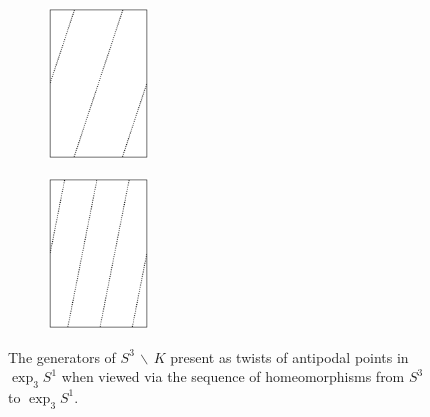 \documentclass[12pt,twoside]{reedthesis}
\theoremstyle{definition}
\newcommand{\wo}{\, \backslash \,}
\begin{document}
\begin{figure}[t]
  \centering
  \begin{subfigure}[t]{0.25\textwidth}
    \centering
    \includegraphics[height=4cm]{figures/antipodal_subset_path_1.pdf}
  \end{subfigure}
  \begin{subfigure}[t]{0.25\textwidth}
    \centering
    \includegraphics[height=4cm]{figures/antipodal_subset_path_2.pdf}
  \end{subfigure}
  \caption{The generators of $S^3 \wo K$ present as twists of antipodal points in $\exp_3 S^1$ when viewed via the sequence of homeomorphisms from $S^3$ to $\exp_3 S^1$.}
  \label{fig:antipodal_point_paths}
\end{figure}
\end{document}
